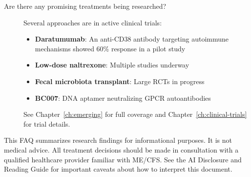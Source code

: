 \begin{description}
\item[Are there any promising treatments being researched?]
Several approaches are in active clinical trials:
\begin{itemize}
    \item \textbf{Daratumumab}: An anti-CD38 antibody targeting autoimmune
      mechanisms showed 60\% response in a pilot study~\cite{Fluge2025daratumumab}
    \item \textbf{Low-dose naltrexone}: Multiple studies underway
    \item \textbf{Fecal microbiota transplant}: Large RCTs in progress
    \item \textbf{BC007}: DNA aptamer neutralizing GPCR
      autoantibodies~\cite{Hohberger2021bc007}
\end{itemize}
See Chapter~\ref{ch:emerging} for full coverage and
Chapter~\ref{ch:clinical-trials} for trial details.

\end{description}

\begin{warning}
This FAQ summarizes research findings for informational purposes. It is not
medical advice. All treatment decisions should be made in consultation with a
qualified healthcare provider familiar with ME/CFS. See the AI Disclosure and
Reading Guide for important caveats about how to interpret this document.
\end{warning}

